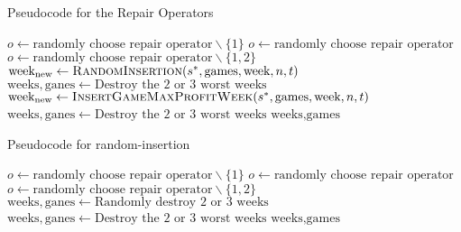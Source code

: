 \documentclass[12pt]{article}
\begin{document}
\begin{algorithm}
    \caption{Pseudocode for the Repair Operators}
    \begin{algorithmic}[1] 
                \State $o\leftarrow \text{randomly choose repair operator}\backslash\{1\}$ 
            \Else
                \State $o\leftarrow \text{randomly choose repair operator}$ 
            \EndIf
                \State $o\leftarrow \text{randomly choose repair operator}\backslash\{1, 2\}$ 
            \EndIf
                    \State $\text{week}_{\text{new}}\leftarrow \Call{RandomInsertion}{s^*, \text{games}, \text{week}, n, t}$
                \EndFor
                \State $\text{weeks}, \text{ganes}\leftarrow \text{Destroy the 2 or 3 worst weeks}$
                    \State $\text{week}_{\text{new}}\leftarrow \Call{InsertGameMaxProfitWeek}{s^*, \text{games}, \text{week}, n, t}$
                \EndFor
                    \State $\text{weeks}, \text{ganes}\leftarrow \text{Destroy the 2 or 3 worst weeks}$
            \EndIf
            \Return $\text{weeks}, \text{games}$
        \EndFunction
    \end{algorithmic}
\end{algorithm}


\begin{algorithm}
    \caption{Pseudocode for random-insertion}
    \begin{algorithmic}[1] 
                \State $o\leftarrow \text{randomly choose repair operator}\backslash\{1\}$ 
            \Else
                \State $o\leftarrow \text{randomly choose repair operator}$ 
            \EndIf
                \State $o\leftarrow \text{randomly choose repair operator}\backslash\{1, 2\}$ 
            \EndIf
                \State $\text{weeks}, \text{ganes}\leftarrow \text{Randomly destroy 2 or 3 weeks}$
                \State $\text{weeks}, \text{ganes}\leftarrow \text{Destroy the 2 or 3 worst weeks}$
            \EndIf
            \Return $\text{weeks}, \text{games}$
        \EndFunction
    \end{algorithmic}
\end{algorithm}
\end{document}
